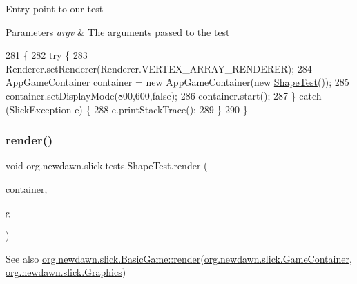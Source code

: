 Entry point to our test


\begin{DoxyParams}{Parameters}
{\em argv} & The arguments passed to the test \\
\hline
\end{DoxyParams}

\begin{DoxyCode}
281                                            \{
282         \textcolor{keywordflow}{try} \{
283             Renderer.setRenderer(Renderer.VERTEX\_ARRAY\_RENDERER);
284             AppGameContainer container = \textcolor{keyword}{new} AppGameContainer(\textcolor{keyword}{new} \mbox{\hyperlink{classorg_1_1newdawn_1_1slick_1_1tests_1_1_shape_test_a353b82c407ab383e09830031e6eadd35}{ShapeTest}}());
285             container.setDisplayMode(800,600,\textcolor{keyword}{false});
286             container.start();
287         \} \textcolor{keywordflow}{catch} (SlickException e) \{
288             e.printStackTrace();
289         \}
290     \}
\end{DoxyCode}
\mbox{\label{classorg_1_1newdawn_1_1slick_1_1tests_1_1_shape_test_ac2f9e4424e48634d0d2c8dc30df974db}} 
\subsubsection{\texorpdfstring{render()}{render()}}
{\footnotesize\ttfamily void org.\+newdawn.\+slick.\+tests.\+Shape\+Test.\+render (\begin{DoxyParamCaption}\item[{\mbox{\hyperlink{classorg_1_1newdawn_1_1slick_1_1_game_container}{Game\+Container}}}]{container,  }\item[{\mbox{\hyperlink{classorg_1_1newdawn_1_1slick_1_1_graphics}{Graphics}}}]{g }\end{DoxyParamCaption})\hspace{0.3cm}{\ttfamily [inline]}}

\begin{DoxySeeAlso}{See also}
\mbox{\hyperlink{interfaceorg_1_1newdawn_1_1slick_1_1_game_af1a4670d43eb3ba04dfcf55ab1975b64}{org.\+newdawn.\+slick.\+Basic\+Game\+::render}}(\mbox{\hyperlink{classorg_1_1newdawn_1_1slick_1_1_game_container}{org.\+newdawn.\+slick.\+Game\+Container}}, \mbox{\hyperlink{classorg_1_1newdawn_1_1slick_1_1_graphics}{org.\+newdawn.\+slick.\+Graphics}}) 
\end{DoxySeeAlso}


